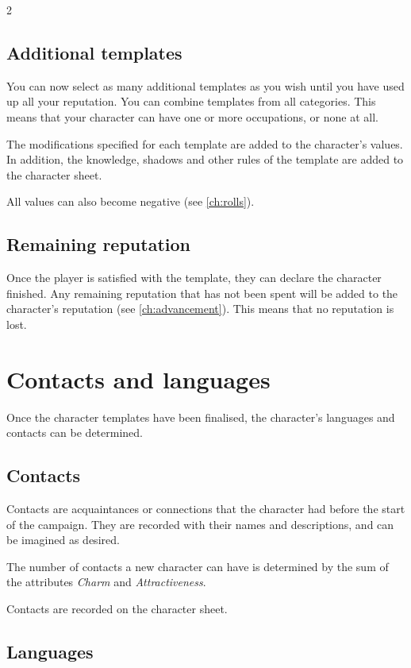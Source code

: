 \begin{multicols}{2}
\subsection{Additional templates}

You can now select as many additional templates as you wish until you have used up all your reputation. You can combine templates from all categories. This means that your character can have one or more occupations, or none at all.

The modifications specified for each template are added to the character's values. In addition, the knowledge, shadows and other rules of the template are added to the character sheet.

All values can also become negative (see \cref{ch:rolls}).

\subsection{Remaining reputation}

Once the player is satisfied with the template, they can declare the character finished. Any remaining reputation that has not been spent will be added to the character's reputation (see \cref{ch:advancement}). This means that no reputation is lost.

\section{Contacts and languages}

Once the character templates have been finalised, the character's languages and contacts can be determined.

\subsection{Contacts}

Contacts are acquaintances or connections that the character had before the start of the campaign. They are recorded with their names and descriptions, and can be imagined as desired.

The number of contacts a new character can have is determined by the sum of the attributes \textit{Charm} and \textit{Attractiveness}.

Contacts are recorded on the character sheet.

\subsection{Languages}


\end{multicols}
